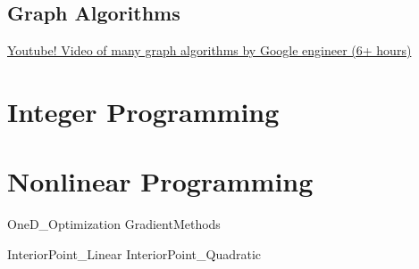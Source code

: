 \documentclass[letter,12pt]{book}
\renewcommand{\0}{\mathbf{0}}
\begin{document}
\chapter{Graph Algorithms}
\begin{resource}
\href{https://www.youtube.com/watch?v=09_LlHjoEiY}{Youtube!  Video of many graph algorithms by Google engineer (6+ hours)}
\end{resource}



\part{Integer Programming}
\label{part:IntegerProgramming}



%
%
%


\ifdefined \nlptext
\part{Nonlinear Programming}

{OneD_Optimization}
{GradientMethods}

{InteriorPoint_Linear}
{InteriorPoint_Quadratic}
\end{document}

